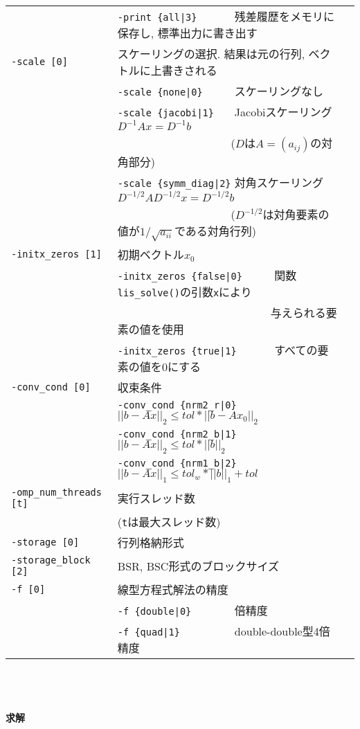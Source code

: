 \documentclass[a4paper]{jarticle}
\begin{document}
{{\begin{minipage}[t]{\textwidth}
\begin{center}
\begin{tabular}{l|ll}
                       & \verb=-print {all|3}      =  残差履歴をメモリに保存し, 標準出力に書き出す\\
\verb=-scale [0]=      & スケーリングの選択. 結果は元の行列, ベクトルに上書きされる \\
                       & \verb=-scale {none|0}     =  スケーリングなし \\ 
                       & \verb=-scale {jacobi|1}   =  Jacobiスケーリング $D^{-1}Ax=D^{-1}b$ \\
                       & \verb=                    =  ($D$は$A=(a_{ij})$の対角部分)\\
                       & \verb=-scale {symm_diag|2}=  対角スケーリング $D^{-1/2}AD^{-1/2}x=D^{-1/2}b$ \\
                       & \verb=                    =  ($D^{-1/2}$は対角要素の値が$1/\sqrt{a_{ii}}$である対角行列) \\ 
\verb=-initx_zeros [1]= & 初期ベクトル$x_{0}$  \\
                       & \verb=-initx_zeros {false|0}     =  関数\verb=lis_solve()=の引数\verb=x=により \\
                       & \verb=                           =  与えられる要素の値を使用 \\
                       & \verb=-initx_zeros {true|1}      =  すべての要素の値を$0$にする\\
\verb=-conv_cond [0]= & 収束条件  \\
                       & \verb=-conv_cond {nrm2_r|0}     =  $||b-Ax||_2 \le tol * ||b-Ax_0||_2$ \\
                       & \verb=-conv_cond {nrm2_b|1}     =  $||b-Ax||_2 \le tol * ||b||_2$\\
                       & \verb=-conv_cond {nrm1_b|2}     =  $||b-Ax||_1 \le tol_w * ||b||_1 + tol$\\
\verb=-omp_num_threads [t]= & 実行スレッド数         \\ 
                            & (\verb=t=は最大スレッド数) \\
\verb=-storage [0]=    & 行列格納形式 \\
\verb=-storage_block [2]= & BSR, BSC形式のブロックサイズ \\ 
\verb=-f [0]=          & 線型方程式解法の精度 \\
                       & \verb=-f {double|0}       =   倍精度 \\
                       & \verb=-f {quad|1}         =   double-double型4倍精度 \\
\hline         
\end{tabular}
\end{center}
\end{minipage}
\\ \\ \\
\noindent
{\bf 求解}

}}
\end{document}
